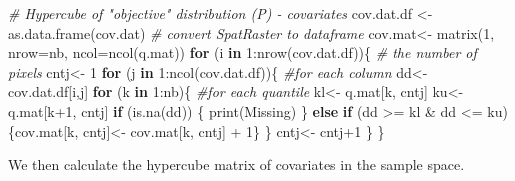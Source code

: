 \documentclass[
]{book}
\newenvironment{Shaded}{\begin{snugshade}}{\end{snugshade}}
\newcommand{\AttributeTok}[1]{\textcolor[rgb]{0.77,0.63,0.00}{#1}}
\newcommand{\CommentTok}[1]{\textcolor[rgb]{0.56,0.35,0.01}{\textit{#1}}}
\newcommand{\ControlFlowTok}[1]{\textcolor[rgb]{0.13,0.29,0.53}{\textbf{#1}}}
\newcommand{\DecValTok}[1]{\textcolor[rgb]{0.00,0.00,0.81}{#1}}
\newcommand{\FunctionTok}[1]{\textcolor[rgb]{0.00,0.00,0.00}{#1}}
\newcommand{\NormalTok}[1]{#1}
\newcommand{\OtherTok}[1]{\textcolor[rgb]{0.56,0.35,0.01}{#1}}
\newcommand{\SpecialCharTok}[1]{\textcolor[rgb]{0.00,0.00,0.00}{#1}}
\newcommand{\StringTok}[1]{\textcolor[rgb]{0.31,0.60,0.02}{#1}}
\begin{document}
\begin{Shaded}
\begin{Highlighting}[]
\CommentTok{\# Hypercube of "objective" distribution (P) {-} covariates}
\NormalTok{  cov.dat.df }\OtherTok{\textless{}{-}} \FunctionTok{as.data.frame}\NormalTok{(cov.dat) }\CommentTok{\# convert SpatRaster to dataframe}
\NormalTok{  cov.mat}\OtherTok{\textless{}{-}} \FunctionTok{matrix}\NormalTok{(}\DecValTok{1}\NormalTok{, }\AttributeTok{nrow=}\NormalTok{nb, }\AttributeTok{ncol=}\FunctionTok{ncol}\NormalTok{(q.mat))}
    \ControlFlowTok{for}\NormalTok{ (i }\ControlFlowTok{in} \DecValTok{1}\SpecialCharTok{:}\FunctionTok{nrow}\NormalTok{(cov.dat.df))\{ }\CommentTok{\# the number of pixels}
\NormalTok{      cntj}\OtherTok{\textless{}{-}} \DecValTok{1} 
    \ControlFlowTok{for}\NormalTok{ (j }\ControlFlowTok{in} \DecValTok{1}\SpecialCharTok{:}\FunctionTok{ncol}\NormalTok{(cov.dat.df))\{ }\CommentTok{\#for each column}
\NormalTok{      dd}\OtherTok{\textless{}{-}}\NormalTok{ cov.dat.df[i,j]  }
      \ControlFlowTok{for}\NormalTok{ (k }\ControlFlowTok{in} \DecValTok{1}\SpecialCharTok{:}\NormalTok{nb)\{  }\CommentTok{\#for each quantile}
\NormalTok{        kl}\OtherTok{\textless{}{-}}\NormalTok{ q.mat[k, cntj] }
\NormalTok{        ku}\OtherTok{\textless{}{-}}\NormalTok{ q.mat[k}\SpecialCharTok{+}\DecValTok{1}\NormalTok{, cntj] }
        \ControlFlowTok{if}\NormalTok{ (}\FunctionTok{is.na}\NormalTok{(dd)) \{}
          \FunctionTok{print}\NormalTok{(}\StringTok{\textquotesingle{}Missing\textquotesingle{}}\NormalTok{)}
\NormalTok{        \}}
        \ControlFlowTok{else} \ControlFlowTok{if}\NormalTok{ (dd }\SpecialCharTok{\textgreater{}=}\NormalTok{ kl }\SpecialCharTok{\&}\NormalTok{ dd }\SpecialCharTok{\textless{}=}\NormalTok{ ku)\{cov.mat[k, cntj]}\OtherTok{\textless{}{-}}\NormalTok{ cov.mat[k, cntj] }\SpecialCharTok{+} \DecValTok{1}\NormalTok{\} }
\NormalTok{      \}}
\NormalTok{      cntj}\OtherTok{\textless{}{-}}\NormalTok{ cntj}\SpecialCharTok{+}\DecValTok{1}
\NormalTok{    \}}
\NormalTok{  \}}
\end{Highlighting}
\end{Shaded}

We then calculate the hypercube matrix of covariates in the sample space.
\end{document}

